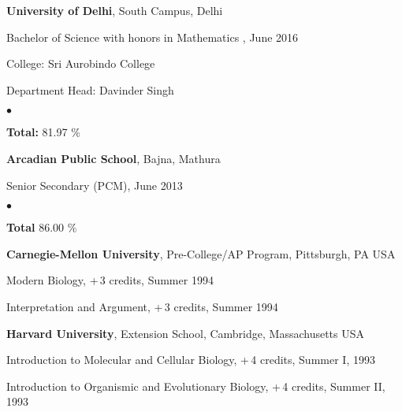\documentclass[margin,line]{res}
\newenvironment{list1}{
  \begin{list}{\ding{113}}{%
      \setlength{\itemsep}{0in}
      \setlength{\parsep}{0in} \setlength{\parskip}{0in}
      \setlength{\topsep}{0in} \setlength{\partopsep}{0in}
      \setlength{\leftmargin}{0.17in}}}{\end{list}}
\newenvironment{list2}{
  \begin{list}{$\bullet$}{%
      \setlength{\itemsep}{0in}
      \setlength{\parsep}{0in} \setlength{\parskip}{0in}
      \setlength{\topsep}{0in} \setlength{\partopsep}{0in}
      \setlength{\leftmargin}{0.2in}}}{\end{list}}
\begin{document}
\begin{resume}
{\bf University of Delhi}, South Campus, Delhi\\
\vspace*{-.1in}
\begin{list1}
\item[] Bachelor of Science with honors in Mathematics , June 2016
\vspace*{.05in}
\item[] College:  Sri Aurobindo College
\item[] Department Head:  Davinder Singh
\begin{list2}
\item[] {\bf \footnotesize Total:} 81.97 \%
\end{list2}
\end{list1}

{\bf Arcadian Public School}, Bajna, Mathura\\
\vspace*{-.1in}
\begin{list1}
\item[] Senior Secondary (PCM), June 2013
\begin{list2}
\item[] {\bf \footnotesize Total} 86.00 \%
\end{list2}
\end{list1}

{\bf Carnegie-Mellon University}, Pre-College/AP Program, Pittsburgh, PA USA\\
\vspace*{-.1in}
\begin{list1}
\item[] Modern Biology, +\,3 credits, Summer 1994
\item[] Interpretation and Argument, +\,3 credits, Summer 1994
\end{list1}

{\bf Harvard University}, Extension School, Cambridge, Massachusetts USA\\
\vspace*{-.1in}
\begin{list1}
\item[] Introduction to Molecular and Cellular Biology, +\,4 credits, Summer I, 1993
\item[] Introduction to Organismic and Evolutionary Biology, +\,4 credits, Summer II, 1993
\end{list1}


\end{resume}
\end{document}
